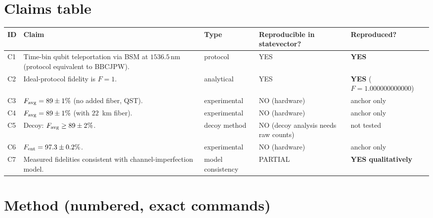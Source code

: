 \documentclass[11pt]{article}
\begin{document}
\section{Claims table}

\begin{longtable}{p{0.6cm} p{7.4cm} p{2.6cm} p{2.6cm} p{2.6cm}}
\toprule
\textbf{ID} & \textbf{Claim} & \textbf{Type} & \textbf{Reproducible in statevector?} & \textbf{Reproduced?} \\
\midrule
C1 & Time-bin qubit teleportation via BSM at $1536.5$\,nm (protocol equivalent to BBCJPW). & protocol & YES & \textbf{YES} \\
C2 & Ideal-protocol fidelity is $F = 1$. & analytical & YES & \textbf{YES} ($F = 1.000000000000$) \\
C3 & $F_{\rm avg} = 89 \pm 1\%$ (no added fiber, QST). & experimental & NO (hardware) & anchor only \\
C4 & $F_{\rm avg} = 89 \pm 1\%$ (with $22$~km fiber). & experimental & NO (hardware) & anchor only \\
C5 & Decoy: $F_{\rm avg} \geq 89 \pm 2\%$. & decoy method & NO (decoy analysis needs raw counts) & not tested \\
C6 & $F_{\rm ent} = 97.3 \pm 0.2\%$. & experimental & NO (hardware) & anchor only \\
C7 & Measured fidelities consistent with channel-imperfection model. & model consistency & PARTIAL & \textbf{YES qualitatively} \\
\bottomrule
\end{longtable}

\section{Method (numbered, exact commands)}
\end{document}
